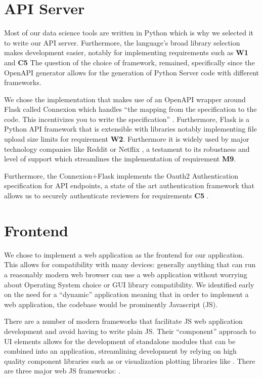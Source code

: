 \documentclass[\version]{l4proj}
\begin{document}
\section{API Server}

Most of our data science tools are written in Python which is why we selected it to write our API server.
Furthermore, the language's broad library selection makes development easier, notably for implementing requirements such as \textbf{W1} and \textbf{C5}
The question of the choice of framework, remained, specifically since the OpenAPI generator allows for the generation of Python Server code with different frameworks.

We chose the implementation that makes use of an OpenAPI wrapper around Flask called Connexion which handles ``the mapping from the specification to the code.
This incentivizes you to write the specification'' \autocite{ZalandoConnexion2020}.
Furthermore, Flask is a Python API framework that is extensible with libraries notably implementing file upload size limits for requirement \textbf{W2}. Furthermore it is widely used by major technology companies like Reddit or Netflix \autocite{WhyDevelopersFlask}, a testament to its robustness and level of support which streamlines the implementation of requirement \textbf{M9}.

Furthermore, the Connexion+Flask implements the Oauth2 Authentication specification for API endpoints, a state of the art authentication framework that allows us to securely authenticate reviewers for requirements \textbf{C5} \autocite{jonesOAuthAuthorizationFramework2012}.

\section{Frontend}

We chose to implement a web application as the frontend for our application.
This allows for compatibility with many devices: generally anything that can run a reasonably modern web browser can use a web application without worrying about Operating System choice or GUI library compatibility.
We identified early on the need for a ``dynamic'' application meaning that in order to implement a web application, the codebase would be prominently Javascript (JS).

There are a number of modern frameworks that facilitate JS web application development and avoid having to write plain JS.
Their ``component'' approach to UI elements allows for the development of standalone modules that can be combined into an application, streamlining development by relying on high quality component libraries such as \textcite{Materialui2020} or visualization plotting libraries like \textcite{Recharts2020}.
There are three major web JS frameworks: \textcite{Angular2020,FacebookReact2020,VuejsVue2020}.
\end{document}
